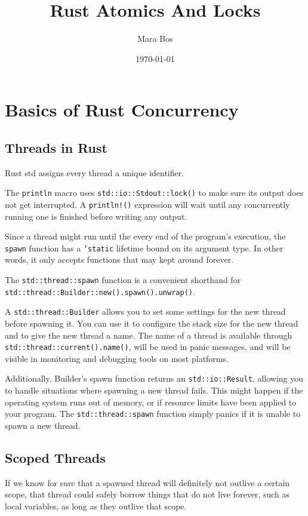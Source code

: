 \documentclass[11pt]{article}
\author{Mara Bos}
\date{\today}
\title{Rust Atomics And Locks}
\begin{document}
\maketitle
\tableofcontents


\section{Basics of Rust Concurrency}
\label{sec:orgf3e6388}
\subsection{Threads in Rust}
\label{sec:orgc48e941}
Rust std assigns every thread a unique identifier.

\begin{remark}
The \texttt{println} macro uses \texttt{std::io::Stdout::lock()} to make sure its output does not get interrupted.
A \texttt{println!()} expression will wait until any concurrently running one is finished before writing
any output.
\end{remark}

Since a thread might run until the every end of the program's execution, the \texttt{spawn} function has
a \texttt{'static} lifetime bound on its argument type. In other words, it only accepts functions that
may kept around forever.

\begin{remark}
The \texttt{std::thread::spawn} function is a convenient shorthand for
\texttt{std::thread::Builder::new().spawn().unwrap()}.

A \texttt{std::thread::Builder} allows you to set some settings for the new thread before spawning it.
You can use it to configure the stack size for the new thread and to give the new thread a name.
The name of a thread is available through \texttt{std::thread::current().name()}, will be used in panic
messages, and will be visible in monitoring and debugging tools on most platforms.

Additionally, Builder’s spawn function returns an \texttt{std::io::Result}, allowing you
to handle situations where spawning a new thread fails. This might happen if the operating
system runs out of memory, or if resource limits have been applied to your program. The
\texttt{std::thread::spawn} function simply panics if it is unable to spawn a new thread.
\end{remark}
\subsection{Scoped Threads}
\label{sec:orgeadd6c8}
If we know for sure that a spawned thread will definitely not outlive a certain scope, that
thread could safely borrow things that do not live forever, such as local variables, as long as
they outlive that scope.
\end{document}
